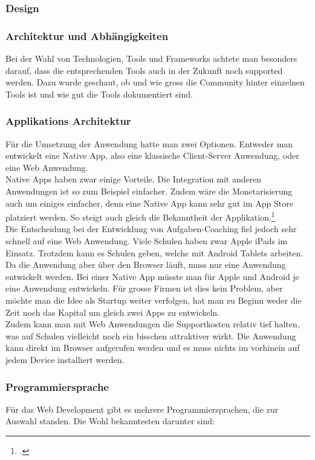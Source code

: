 \subsubsection{Design}
\subsubsection*{Architektur und Abhängigkeiten}
Bei der Wahl von Technologien, Tools und Frameworks achtete man besonders darauf, dass die entsprechenden Tools auch in der Zukunft noch supported werden. Dazu wurde geschaut, ob und wie gross die Community hinter einzelnen Tools ist und wie gut die Tools dokumentiert sind.

\subsubsection*{Applikations Architektur}
Für die Umsetzung der Anwendung hatte man zwei Optionen. Entweder man entwickelt eine Native App, also eine klassische Client-Server Anwendung, oder eine Web Anwendung. \\

Native Apps haben zwar einige Vorteile. Die Integration mit anderen Anwendungen ist so zum Beispiel einfacher. Zudem wäre die Monetarisierung auch um einiges einfacher, denn eine Native App kann sehr gut im App Store platziert werden. So steigt auch gleich die Bekanntheit der Applikation.\footcite{native_app} \\

Die Entscheidung bei der Entwicklung von Aufgaben-Coaching fiel jedoch sehr schnell auf eine Web Anwendung. Viele Schulen haben zwar Apple iPads im Einsatz. Trotzdem kann es Schulen geben, welche mit Android Tablets arbeiten. Da die Anwendung aber über den Browser läuft, muss nur eine Anwendung entwickelt werden. Bei einer Native App müsste man für Apple und Android je eine Anwendung entwickeln. Für grosse Firmen ist dies kein Problem, aber möchte man die Idee als Startup weiter verfolgen, hat man zu Beginn weder die Zeit noch das Kapital um gleich zwei Apps zu entwickeln. \\
Zudem kann man mit Web Anwendungen die Supportkosten relativ tief halten, was auf Schulen vielleicht noch ein bisschen attraktiver wirkt. Die Anwendung kann direkt im Browser aufgerufen werden und es muss nichts im vorhinein auf jedem Device installiert werden.

\subsubsection*{Programmiersprache}
Für das Web Development gibt es mehrere Programmiersprachen, die zur Auswahl standen. Die Wohl bekanntesten darunter sind:

